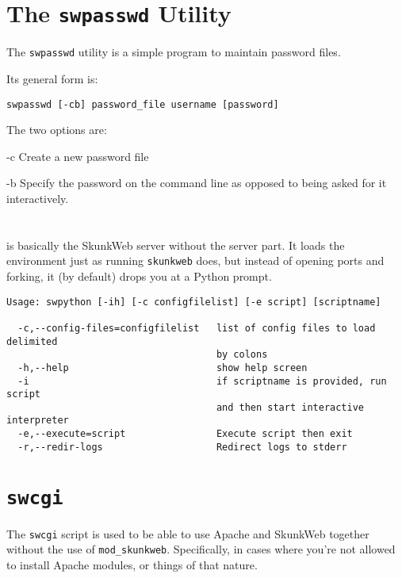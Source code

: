 \documentclass[titlepage]{manual}
\begin{document}
\section{The \texttt{swpasswd} Utility}
\label{swpasswd}
The \texttt{swpasswd} utility is a simple program to maintain
password files.  

Its general form is:
\begin{verbatim}
swpasswd [-cb] password_file username [password]
\end{verbatim}

The two options are:
\begin{argdesc}
\item[-c] Create a new password file
\item[-b] Specify the password on the command line as opposed to being
asked for it interactively.
\end{argdesc}


\section{\swpython}
\label{swpython}
\index{\swpython}
\swpython is basically the SkunkWeb server without the server part.  It
loads the environment just as running \texttt{skunkweb} does, but instead
of opening ports and forking, it (by default) drops you at a Python prompt.

\begin{verbatim}
Usage: swpython [-ih] [-c configfilelist] [-e script] [scriptname]

  -c,--config-files=configfilelist   list of config files to load delimited
                                     by colons
  -h,--help                          show help screen
  -i                                 if scriptname is provided, run script
                                     and then start interactive interpreter
  -e,--execute=script                Execute script then exit
  -r,--redir-logs                    Redirect logs to stderr
\end{verbatim}

\section{\texttt{swcgi}}
\label{swcgi}

The \texttt{swcgi} script is used to be able to use Apache and
SkunkWeb together without the use of \texttt{mod_skunkweb}.
Specifically, in cases where you're not allowed to install Apache
modules, or things of that nature.
\end{document}
